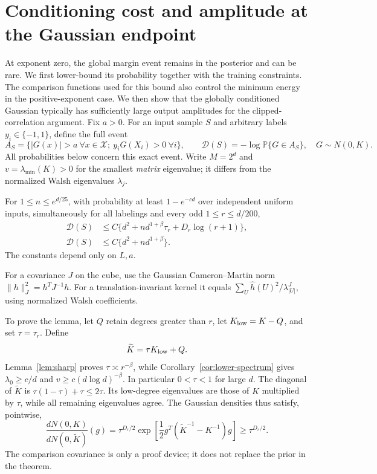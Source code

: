 \section{Conditioning cost and amplitude at the Gaussian endpoint}
\label{sec:zero-conditioning}
At exponent zero, the global margin event remains in the posterior and
can be rare. We first lower-bound its probability together with the
training constraints. The comparison functions used for this bound also
control the minimum energy in the positive-exponent case. We then show
that the globally conditioned Gaussian typically has sufficiently large
output amplitudes for the clipped-correlation argument.
Fix $a>0$. For an input sample $S$ and arbitrary labels $y_i\in\{-1,1\}$,
define the full event
\[
 A_S=\{|G(x)|>a\ \forall x\in\mathcal X;\ y_iG(X_i)>0\ \forall i\},
 \qquad \mathcal D(S)=-\log\mathbb P\{G\in A_S\},\quad G\sim N(0,K).
\]
All probabilities below concern this exact event. Write $M=2^d$ and
$v=\lambda_{\min}(K)>0$ for the smallest \emph{matrix} eigenvalue;
it differs from the normalized Walsh eigenvalues $\lambda_j$.

\begin{lemma}\label{lem:zero-denominator}
For $1\le n\le e^{d/25}$, with probability at least $1-e^{-c d}$ over
independent uniform inputs, simultaneously for all labelings and every
odd $1\le r\le d/200$,
\begin{align}
 \mathcal D(S)&\le C\{d^2+n d^{1+\beta}\tau_r+D_r\log(r+1)\},
 \label{eq:zero-adaptive-cost}\\
 \mathcal D(S)&\le C\{d^2+n d^{1+\beta}\}.
 \label{eq:zero-rough-cost}
\end{align}
The constants depend only on $L,a$.
\end{lemma}
For a covariance $J$ on the cube, use the Gaussian Cameron--Martin norm $\|h\|_J^2=h^TJ^{-1}h$. For a translation-invariant kernel it equals $\sum_U\widehat h(U)^2/\lambda^J_{|U|}$, using normalized Walsh coefficients.

To prove the lemma, let $Q$ retain degrees greater than $r$, let $K_{\rm low}=K-Q$, and set $\tau=\tau_r$. Define
\[
 \widetilde K=\tau K_{\rm low}+Q.
\]
Lemma~\ref{lem:sharp} proves $\tau\asymp r^{-\beta}$, while Corollary~\ref{cor:lower-spectrum} gives $\lambda_0\ge c/d$ and $v\ge c(d\log d)^{-\beta}$. In particular $0<\tau<1$ for large $d$. The diagonal of $\widetilde K$ is $\tau(1-\tau)+\tau\le2\tau$. Its low-degree eigenvalues are those of $K$ multiplied by $\tau$, while all remaining eigenvalues agree. The Gaussian densities thus satisfy, pointwise,
\begin{equation}\label{eq:zero-density-compare}
 \frac{dN(0,K)}{dN(0,\widetilde K)}(g)
 =\tau^{D_r/2}\exp\!\left[\frac12g^T(\widetilde K^{-1}-K^{-1})g\right]
 \ge\tau^{D_r/2}.
\end{equation}
The comparison covariance is only a proof device; it does not replace the prior in the theorem.

